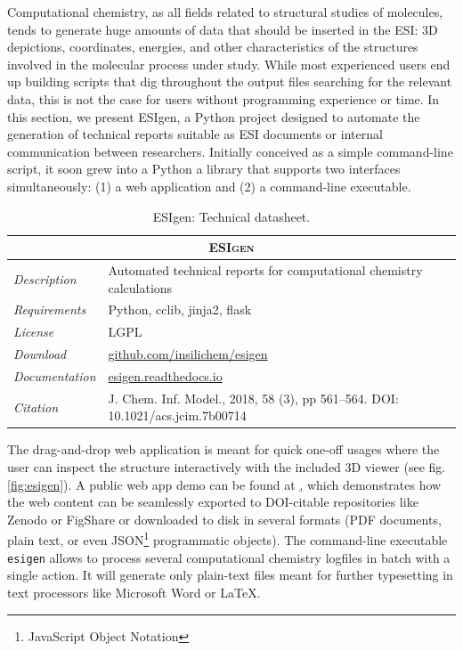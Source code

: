 Computational chemistry, as all fields related to structural studies of molecules, tends to generate huge amounts of data that should be inserted in the ESI: 3D depictions, coordinates, energies, and other characteristics of the structures involved in the molecular process under study. While most experienced users end up building scripts that dig throughout the output files searching for the relevant data, this is not the case for users without programming experience or time. In this section, we present ESIgen,\cite{esigen} a Python project designed to automate the generation of technical reports suitable as ESI documents or internal communication between researchers. Initially conceived as a simple command-line script, it soon grew into a Python a library that supports two interfaces simultaneously: (1) a web application and (2) a command-line executable.


\begin{table}[hbtp]
	\caption[ESIgen: Technical datasheet]{ESIgen: Technical datasheet.}
	\footnotesize
	\newcommand{\tableheading}[1]{\multicolumn{2}{c}{\textsc{#1}}}
	\begin{tabularx}{\textwidth}{RL}
		\toprule
		\tableheading{ESIgen}\\
		\toprule
		\textit{Description} & Automated technical reports for computational chemistry calculations \\
		\midrule
		\textit{Requirements} & Python, cclib, jinja2, flask \\
		\midrule
		\textit{License} & LGPL \\
		\midrule
		\textit{Download} & \href{https://github.com/insilichem/esigen}{github.com/insilichem/esigen} \\
		\midrule
		\textit{Documentation} & \href{http://esigen.readthedocs.io}{esigen.readthedocs.io} \\
		\midrule
		\textit{Citation} & J. Chem. Inf. Model., 2018, 58 (3), pp 561–564. DOI: 10.1021/acs.jcim.7b00714\cite{esigen} \\
		\bottomrule

	\end{tabularx}
\end{table}

The drag-and-drop web application is meant for quick one-off usages where the user can inspect the structure interactively with the included 3D viewer\cite{rose2018ngl} (see fig. \ref{fig:esigen}). A public web app demo can be found at \href{http://esi.insilichem.com}, which demonstrates how the web content can be seamlessly exported to DOI-citable repositories like Zenodo\cite{zenodo} or FigShare\cite{figshare} or downloaded to disk in several formats (PDF documents, plain text, or even JSON\footnote{JavaScript Object Notation} programmatic objects). The command-line executable \texttt{esigen} allows to process several computational chemistry logfiles in batch with a single action. It will generate only plain-text files meant for further typesetting in text processors like Microsoft Word or LaTeX.



